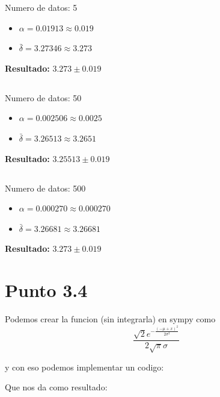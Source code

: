 \documentclass[12pt]{exam}
\begin{document}
Numero de datos: 5

\begin{itemize}
  \item $\alpha = 0.01913 \approx 0.019$
  \item $\bar{\delta} = 3.27346 \approx 3.273$
\end{itemize}


\textbf{Resultado: }$3.273 \pm 0.019$

\subsection{}

Numero de datos: 50

\begin{itemize}
  \item $\alpha = 0.002506 \approx 0.0025$
  \item $\bar{\delta} = 3.26513 \approx 3.2651$
\end{itemize}


\textbf{Resultado: }$3.25513 \pm 0.019$

\subsection{}

Numero de datos: 500

\begin{itemize}
  \item $\alpha = 0.000270 \approx 0.000270$
  \item $\bar{\delta} = 3.26681 \approx 3.26681$
\end{itemize}


\textbf{Resultado: }$3.273 \pm 0.019$

\section{Punto 3.4}

Podemos crear la funcion (sin integrarla) en sympy como
$$\frac{\sqrt{2} e^{- \frac{\left(- \mu + x\right)^{2}}{2 \sigma^{2}}}}{2 \sqrt{\pi} \sigma}$$

y con eso podemos implementar un codigo:



Que nos da como resultado:
\end{document}
